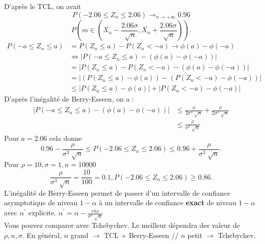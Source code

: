 \documentclass{article}
\theoremstyle{plain}%
\theoremstyle{definition}
\theoremstyle{remark}
\begin{document}
D'après le TCL, on avait 
\[
    P(-2.06 \leq Z_n \leq 2.06) \to_{n \to +\infty } 0.96
\]
\[
    P(m \in (\bar{X_n} - \frac{2.06 \sigma }{\sqrt[]{n}}, \bar{X_n} + \frac{2.06 \sigma }{\sqrt[]{n}}))
.\]
\begin{align*}
    P(-a \leq Z_n \leq a) &= P(Z_n \leq a) - P(Z_n < -a) \to \phi (a) - \phi (-a) \\ 
    &\Leftrightarrow \left| P(-a \leq Z_n \leq a) - (\phi (a) - \phi (-a))\right| \\ 
    &= \left| P(Z_n \leq a) - P(Z_n < -a) - (\phi (a) - \phi (-a)) \right| \\
    &= \left| (P(Z_n \leq a) - \phi (a)) - (P(Z_n < -a) - \phi (-a)) \right| \\
    & \leq \left| P(Z_n \leq a) - \phi (a) \right| + \left| P(Z_n < -a) - \phi(-a) \right|
\end{align*}
D'après l'inégalité de Berry-Esseen, on a : \begin{align*}
    \left| P(-a \leq Z_n \leq a) - (\phi (a) - \phi (-a)) \right| & \leq \frac{\phi }{2 \sigma ^3 \sqrt[]{n}} + \frac{\rho }{2 \sigma ^3 \sqrt[]{n}} \\ 
        & \leq \frac{\rho }{\sigma ^3 \sqrt[]{n}}
\end{align*}
Pour $ a=2.06 $ cela donne  
\[
    0.96 - \frac{\rho }{\sigma ^3 \sqrt[]{n}} \leq P(-2.06 \leq Z_n \leq 2.06) \leq 0.96 + \frac{\rho }{\sigma ^3 \sqrt[]{n}}
.\]
Pour $ \rho =10, \sigma = 1, n = 10000 $ 
\[
    \frac{\rho }{\sigma ^3 \sqrt[]{n}} = \frac{10}{100} = 0.1, P(-2.06 \leq Z_n \leq 2.06) \geq 0.86
.\]
L'inégalité de Berry-Esseen permet de passer d'un intervalle de confiance asymptotique de niveau $ 1-\alpha  $ à un intervalle de confiance \textbf{exact} de niveau $ 1-\alpha  $ avec $ \alpha ^\prime  $ explicite. $ \alpha ^\prime  = \alpha - \frac{rho
}{\sigma ^3 \sqrt[]{n}}$ \\
Vous pouvez comparer avec Tchebychev. Le meilleur dépendra des valeur de $ \rho ,n, \sigma  $. En général, $ n $ grand $\rightarrow$ TCL + Berry-Esseen // $ n $ petit $\rightarrow$ Tchebychev.
\end{document}
